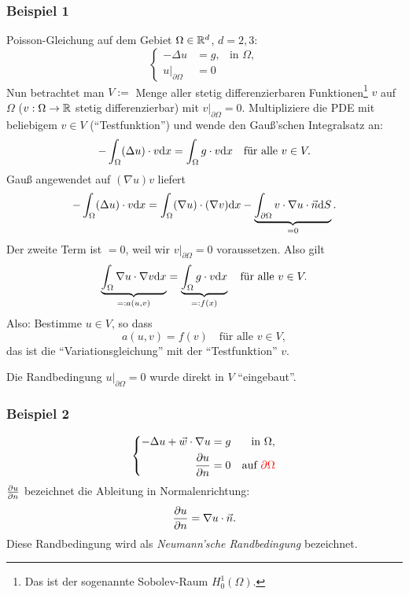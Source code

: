 \subsubsection*{Beispiel 1}
Poisson-Gleichung auf dem Gebiet $\Omega \in \mathbb{R}^d$, $d=2,3$:
\[
  \left\{
    \begin{aligned}
      - \Delta u &= g, &\text{in } \Omega, \\
      u |_{\partial \Omega} &= 0
    \end{aligned}
  \right. \]
Nun betrachtet man $V := $ Menge aller stetig differenzierbaren
Funktionen\footnote{%
  Das ist der sogenannte Sobolev-Raum $H_0^1(\Omega)$.}
$v$ auf $\Omega$ ($v: \Omega \to \mathbb{R}$ stetig differenzierbar) mit
$v|_{\partial \Omega} = 0$. Multipliziere die PDE mit beliebigem $v \in V$
(``Testfunktion'') und wende den Gauß'schen Integralsatz an:
\[ - \int_\Omega (\Delta u) \cdot v \mathrm{d} x
  = \int_\Omega g \cdot v \mathrm{d} x
  \quad \text{für alle } v \in V. \]
Gauß angewendet auf $(\nabla u) v$ liefert
\[ - \int_\Omega (\Delta u) \cdot v \mathrm{d} x
  = \int_\Omega (\nabla u) \cdot (\nabla v) \mathrm{d} x
  - \underbrace{\int_{\partial \Omega} v \cdot \nabla u \cdot \vec{n} \mathrm{d}
    S}_{=0}.
\]
Der zweite Term ist $=0$, weil wir $v|_{\partial \Omega} = 0$ voraussetzen. Also
gilt
\[ \underbrace{\int_\Omega \nabla u \cdot \nabla v \mathrm{d} x}_{=: a(u,v)}
  = \underbrace{\int_\Omega g \cdot v \mathrm{d} x}_{=: f(x)}
  \quad \text{für alle } v \in V. \]
Also: Bestimme $u \in V$, so dass
\[ a(u,v) = f(v) \quad \text{für alle } v \in V, \]
das ist die ``Variationsgleichung'' mit der ``Testfunktion'' $v$.

\begin{rmrk*}
  Die Randbedingung $u |_{\partial \Omega} = 0$ wurde direkt in $V$
  ``eingebaut''.
\end{rmrk*}

\subsubsection*{Beispiel 2}
\[ \left\{
    \begin{aligned}
      - \Delta u + \vec{w} \cdot \nabla u &= g &\text{in } \Omega, \\
      \frac{\partial u}{\partial n} &= 0 &\text{auf } \textcolor{red}{\partial \Omega}
    \end{aligned}
  \right. \]
$\frac{\partial u}{\partial n}$ bezeichnet die Ableitung in Normalenrichtung:
\[ \frac{\partial u}{\partial n} = \nabla u \cdot \vec{n}. \]
Diese Randbedingung wird als \emph{Neumann'sche Randbedingung} bezeichnet.

